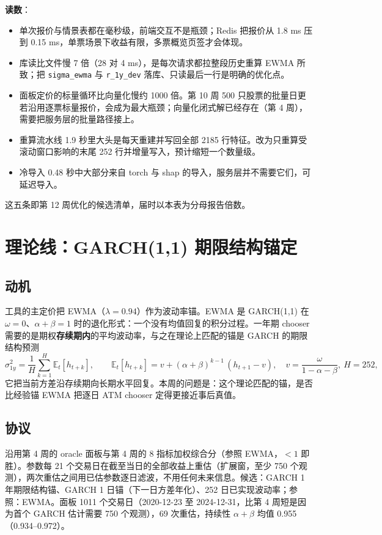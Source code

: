 \documentclass[11pt]{ctexart}
\begin{document}
\textbf{读数}：
\begin{itemize}
  \item 单次报价与情景表都在毫秒级，前端交互不是瓶颈；Redis 把报价从 1.8 ms 压到 0.15 ms，单票场景下收益有限，多票概览页签才会体现。
  \item 库读比文件慢 7 倍（28 对 4 ms），是每次请求都拉整段历史重算 EWMA 所致；把 \texttt{sigma\_ewma} 与 \texttt{r\_1y\_dev} 落库、只读最后一行是明确的优化点。
  \item 面板定价的标量循环比向量化慢约 1000 倍。第 10 周 500 只股票的批量日更若沿用逐票标量报价，会成为最大瓶颈；向量化闭式解已经存在（第 4 周），需要把服务层的批量路径接上。
  \item 重算流水线 1.9 秒里大头是每天重建并写回全部 2185 行特征。改为只重算受滚动窗口影响的末尾 252 行并增量写入，预计缩短一个数量级。
  \item 冷导入 0.48 秒中大部分来自 torch 与 shap 的导入，服务层并不需要它们，可延迟导入。
\end{itemize}
这五条即第 12 周优化的候选清单，届时以本表为分母报告倍数。

\section{理论线：GARCH(1,1) 期限结构锚定}

\subsection{动机}

工具的主定价把 EWMA（$\lambda=0.94$）作为波动率锚。EWMA 是 GARCH(1,1) 在 $\omega=0$、$\alpha+\beta=1$ 时的退化形式：一个没有均值回复的积分过程。一年期 chooser 需要的是期权\textbf{存续期内}的平均波动率，与之在理论上匹配的锚是 GARCH 的期限结构预测
\[
\sigma_{1y}^2=\frac{1}{H}\sum_{k=1}^{H}\mathbb{E}_t[h_{t+k}],\qquad
\mathbb{E}_t[h_{t+k}]=v+(\alpha+\beta)^{k-1}\,(h_{t+1}-v),\quad v=\frac{\omega}{1-\alpha-\beta},\ H=252,
\]
它把当前方差沿存续期向长期水平回复。本周的问题是：这个理论匹配的锚，是否比经验锚 EWMA 把逐日 ATM chooser 定得更接近事后真值。

\subsection{协议}

沿用第 4 周的 oracle 面板与第 4 周的 8 指标加权综合分（参照 EWMA，$<1$ 即胜）。参数每 21 个交易日在截至当日的全部收益上重估（扩展窗，至少 750 个观测），两次重估之间用已估参数逐日滤波，不用任何未来信息。候选：GARCH 1 年期限结构锚、GARCH 1 日锚（下一日方差年化）、252 日已实现波动率；参照：EWMA。面板 1011 个交易日（2020-12-23 至 2024-12-31，比第 4 周短是因为首个 GARCH 估计需要 750 个观测），69 次重估，持续性 $\alpha+\beta$ 均值 0.955（0.934--0.972）。
\end{document}
